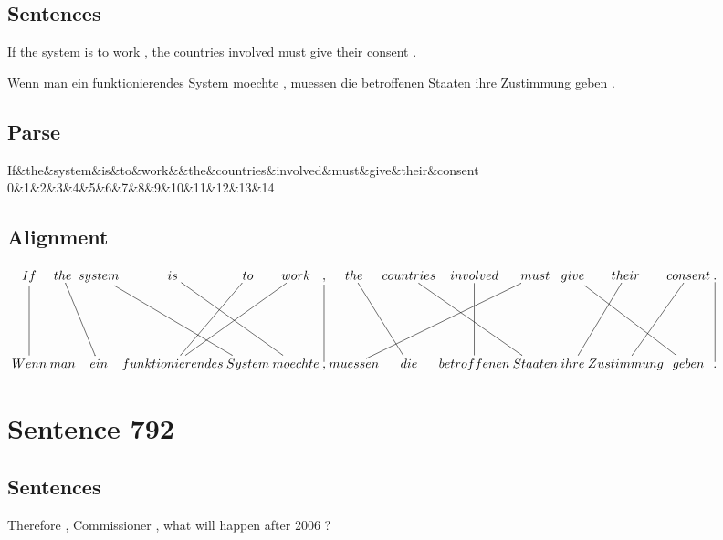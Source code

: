 \documentclass{report}
\begin{document}
\subsection*{Sentences}
If the system is to work , the countries involved must give their consent .

\noindent Wenn man ein funktionierendes System moechte , muessen die betroffenen Staaten ihre Zustimmung geben .



\subsection*{Parse}
\begin{dependency}[theme=simple]
\begin{deptext}[column sep=.5cm, row sep=.1ex]
If\&the\&system\&is\&to\&work\&\&the\&countries\&involved\&must\&give\&their\&consent\\
0\&1\&2\&3\&4\&5\&6\&7\&8\&9\&10\&11\&12\&13\&14\\
\end{deptext}
\end{dependency}


\subsection*{Alignment}
\scriptsize{
$
\xymatrix@C-2.3pc{
If \ar @{-} [dd] & the \ar @{-} [ddr] & system \ar @{-} [ddrr] & is \ar @{-} [ddrr] & to \ar @{-} [ddl] & work \ar @{-} [ddll] & , \ar @{-} [dd] & the \ar @{-} [ddr] & countries \ar @{-} [ddrr] & involved \ar @{-} [dd] & must \ar @{-} [ddlll] & give \ar @{-} [ddrr] & their \ar @{-} [ddl] & consent \ar @{-} [ddl] & . \ar @{-} [dd]\\\\
Wenn & man & ein & funktionierendes & System & moechte & , & muessen & die & betroffenen & Staaten & ihre & Zustimmung & geben & .
}$}
\newpage\section*{Sentence 792}

\subsection*{Sentences}
Therefore , Commissioner , what will happen after 2006 ?
\end{document}
